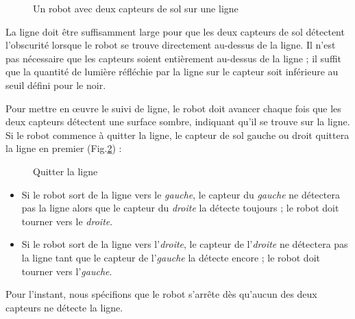 {\begin{figure}
\begin{center}
\caption{Un robot avec deux capteurs de sol sur une ligne}\label{fig.ground-on-a-line}
\end{center}
\end{figure}

La ligne doit être suffisamment large pour que les deux capteurs de sol détectent l'obscurité lorsque le robot se trouve directement au-dessus de la ligne. Il n'est pas nécessaire que les capteurs soient entièrement au-dessus de la ligne ; il suffit que la quantité de lumière réfléchie par la ligne sur le capteur soit inférieure au seuil défini pour le noir.

Pour mettre en œuvre le suivi de ligne, le robot doit avancer chaque fois que les deux capteurs détectent une surface sombre, indiquant qu'il se trouve sur la ligne. Si le robot commence à quitter la ligne, le capteur de sol gauche ou droit quittera la ligne en premier (Fig.\ref{fig.leave-left-right}) :

\begin{figure}
\begin{center}
\caption{Quitter la ligne}\label{fig.leave-left-right}
\end{center}
\end{figure}

\begin{itemize}
\item Si le robot sort de la ligne vers le \emph{gauche}, le capteur du \emph{gauche} ne détectera pas la ligne alors que le capteur du \emph{droite} la détecte toujours ; le robot doit tourner vers le \emph{droite}.
\item Si le robot sort de la ligne vers l'\emph{droite}, le capteur de l'\emph{droite} ne détectera pas la ligne tant que le capteur de l'\emph{gauche} la détecte encore ; le robot doit tourner vers l'\emph{gauche}.
\end{itemize}
Pour l'instant, nous spécifions que le robot s'arrête dès qu'aucun des deux capteurs ne détecte la ligne.

}
